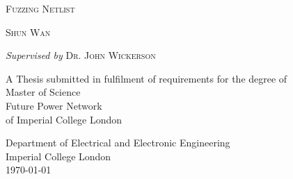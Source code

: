 \thispagestyle{empty}

\begin{center}
\null {}
\renewcommand{\baselinestretch}{2}

\textsc{\huge{Fuzzing Netlist}}



\textsc{\large{Shun Wan}} \\


\textit{Supervised by}
\textsc{\large{Dr. John Wickerson}}\\

A Thesis submitted in fulfilment of requirements for the degree of \\
Master of Science\\
Future Power Network\\
of Imperial College London




Department of Electrical and Electronic Engineering\\
Imperial College London\\
\today

\end{center}


